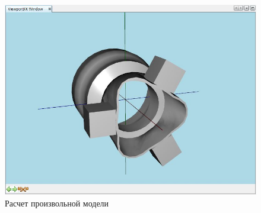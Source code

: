 \documentclass[14pt,oneside,final]{extreport}
\begin{document}
	\begin{figure}[t!]
		\begin{center}
			\includegraphics[scale=0.8]{img/arbitrary-model-test} 
		\end{center}
		\caption{Расчет произвольной модели}
		\label{fig:arbitrary-mode}
	\end{figure}

	
	\setcounter{figure}{\figcount}		
	\setcounter{table}{\tabcount}
\end{document}

